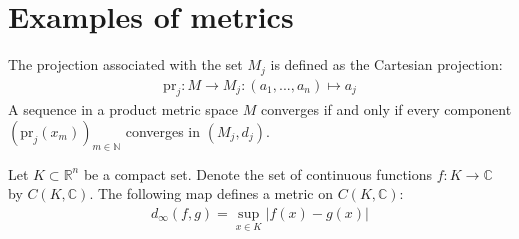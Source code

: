 \section{Examples of metrics}

	\begin{property}
		The projection associated with the set $M_j$ is defined as the Cartesian projection:
		\begin{gather}
			\label{metric:projection}
			\text{pr}_j:M\rightarrow M_j:(a_1,...,a_n)\mapsto a_j
		\end{gather}
		A sequence in a product metric space $M$ converges if and only if every component $(\text{pr}_j(x_m))_{m\in\mathbb{N}}$ converges in $(M_j, d_j)$.
	\end{property}

	\begin{example}
		Let $K\subset\mathbb{R}^n$ be a compact set. Denote the set of continuous functions $f:K\rightarrow\mathbb{C}$ by $C(K,\mathbb{C})$. The following map defines a metric on $C(K,\mathbb{C})$:
		\begin{gather}
			\label{topology:supremum_distance}
			d_\infty(f,g) = \sup_{x\in K}|f(x) - g(x)|
		\end{gather}
	\end{example}

